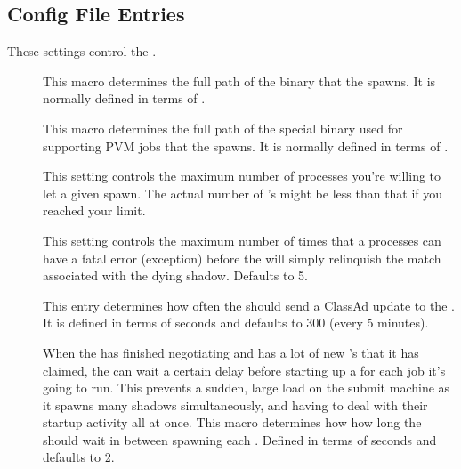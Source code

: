 \subsection{\label{sec:Schedd-Config-File-Entries}
 Config File Entries}

These settings control the .
\begin{description}

\item[] \label{param:Shadow} This macro determines the
  full path of the  binary that the 
  spawns.  It is normally defined in terms of . 
  
\item[] \label{param:ShadowPvm} This macro
  determines the full path of the special  binary
  used for supporting PVM jobs that the  spawns.  It is
  normally defined in terms of .

\item[] \label{param:MaxJobsRunning} This
  setting controls the maximum number of  processes
  you're willing to let a given  spawn.  The actual
  number of 's might be less than that if you reached
  your  limit.

\item[]
  \label{param:MaxShadowExceptions} This setting controls the maximum
  number of times that a  processes can have a fatal
  error (exception) before the  will simply relinquish
  the match associated with the dying shadow.  Defaults to 5.

\item[] \label{param:ScheddInterval}  This
  entry determines how often the  should send a ClassAd
  update to the .  It is defined in terms of seconds
  and defaults to 300 (every 5 minutes).
  
\item[] \label{param:JobStartDelay} When the
   has finished negotiating and has a lot of new
  's that it has claimed, the  can wait
  a certain delay before starting up a  for each job
  it's going to run.  This prevents a sudden, large load on the submit
  machine as it spawns many shadows simultaneously, and having to deal
  with their startup activity all at once.  This macro determines how
  how long the  should wait in between spawning each
  .  Defined in terms of seconds and defaults to 2. 
  

\end{description}
